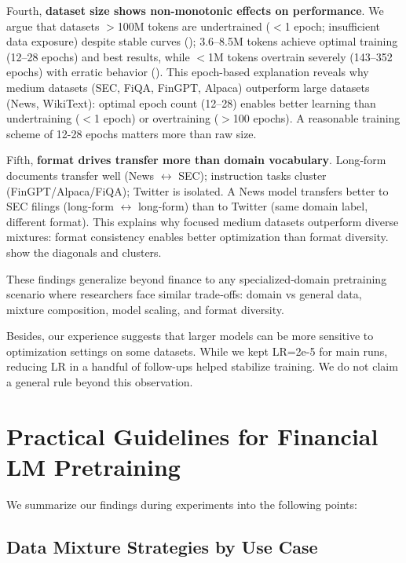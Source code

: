 Fourth, \textbf{dataset size shows non-monotonic effects on performance}. We argue that datasets $>$100M tokens are undertrained ($<$1 epoch; insufficient data exposure) despite stable curves (); 3.6–8.5M tokens achieve optimal training (12–28 epochs) and best results, while $<$1M tokens overtrain severely (143–352 epochs) with erratic behavior (). This epoch-based explanation reveals why medium datasets (SEC, FiQA, FinGPT, Alpaca) outperform large datasets (News, WikiText): optimal epoch count (12–28) enables better learning than undertraining ($<$1 epoch) or overtraining ($>$100 epochs). A reasonable training scheme of 12-28 epochs matters more than raw size.

Fifth, \textbf{format drives transfer more than domain vocabulary}. Long‑form documents transfer well (News $\leftrightarrow$ SEC); instruction tasks cluster (FinGPT/Alpaca/FiQA); Twitter is isolated. A News model transfers better to SEC filings (long‑form $\leftrightarrow$ long‑form) than to Twitter (same domain label, different format). This explains why focused medium datasets outperform diverse mixtures: format consistency enables better optimization than format diversity.  show the diagonals and clusters.

These findings generalize beyond finance to any specialized‑domain pretraining scenario where researchers face similar trade‑offs: domain vs general data, mixture composition, model scaling, and format diversity.

Besides, our experience suggests that larger models can be more sensitive to optimization settings on some datasets. While we kept LR=2e-5 for main runs, reducing LR in a handful of follow-ups helped stabilize training. We do not claim a general rule beyond this observation.

\section{Practical Guidelines for Financial LM Pretraining}

We summarize our findings during experiments into the following points:

\subsection{Data Mixture Strategies by Use Case}

